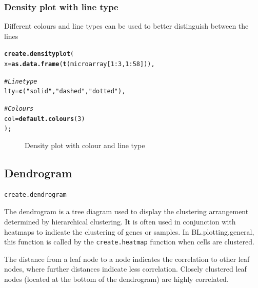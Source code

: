 \documentclass[letterpaper]{article}\usepackage[]{graphicx}\usepackage[]{color}
\makeatletter
\newcommand{\hlnum}[1]{\textcolor[rgb]{0.686,0.059,0.569}{#1}}%
\newcommand{\hlstr}[1]{\textcolor[rgb]{0.192,0.494,0.8}{#1}}%
\newcommand{\hlcom}[1]{\textcolor[rgb]{0.678,0.584,0.686}{\textit{#1}}}%
\newcommand{\hlopt}[1]{\textcolor[rgb]{0,0,0}{#1}}%
\newcommand{\hlstd}[1]{\textcolor[rgb]{0.345,0.345,0.345}{#1}}%
\newcommand{\hlkwc}[1]{\textcolor[rgb]{0.333,0.667,0.333}{#1}}%
\newcommand{\hlkwd}[1]{\textcolor[rgb]{0.737,0.353,0.396}{\textbf{#1}}}%
\newenvironment{kframe}{%
 \def\at@end@of@kframe{}%
 \ifinner\ifhmode%
  \def\at@end@of@kframe{\end{minipage}}%
  \begin{minipage}{\columnwidth}%
 \fi\fi%
 \def\FrameCommand##1{\hskip\@totalleftmargin \hskip-\fboxsep
 \colorbox{shadecolor}{##1}\hskip-\fboxsep
     \hskip-\linewidth \hskip-\@totalleftmargin \hskip\columnwidth}%
 \MakeFramed {\advance\hsize-\width
   \@totalleftmargin\z@ \linewidth\hsize
   \@setminipage}}%
 {\par\unskip\endMakeFramed%
 \at@end@of@kframe}
\newenvironment{knitrout}{}{} %
\makeatother
\begin{document}
\subsubsection{Density plot with line type}
Different colours and line types can be used to better distinguish between the lines

\begin{knitrout}
\color{fgcolor}\begin{kframe}
\begin{alltt}
\hlkwd{create.densityplot}\hlstd{(}
    \hlkwc{x} \hlstd{=} \hlkwd{as.data.frame}\hlstd{(}\hlkwd{t}\hlstd{(microarray[}\hlnum{1}\hlopt{:}\hlnum{3}\hlstd{,}\hlnum{1}\hlopt{:}\hlnum{58}\hlstd{])),}

    \hlcom{# Line type}
    \hlkwc{lty} \hlstd{=} \hlkwd{c}\hlstd{(}\hlstr{"solid"}\hlstd{,} \hlstr{"dashed"}\hlstd{,} \hlstr{"dotted"}\hlstd{),}

    \hlcom{# Colours}
    \hlkwc{col} \hlstd{=} \hlkwd{default.colours}\hlstd{(}\hlnum{3}\hlstd{)}
    \hlstd{);}
\end{alltt}
\end{kframe}\begin{figure}[]


{\centering {} 

}

\caption[Density plot with colour and line type]{Density plot with colour and line type\label{fig:densityplot2}}
\end{figure}


\end{knitrout}

\subsection{Dendrogram}
\begin{verbatim}
create.dendrogram
\end{verbatim}

The dendrogram is a tree diagram used to display the clustering arrangement determined by hierarchical clustering. It is often used in conjunction with heatmaps to indicate the clustering of genes or samples. In BL.plotting.general, this function is called by the \verb|create.heatmap| function when cells are clustered.

The distance from a leaf node to a node indicates the correlation to other leaf nodes, where further distances indicate less correlation. Closely clustered leaf nodes (located at the bottom of the dendrogram) are highly correlated.
\end{document}
